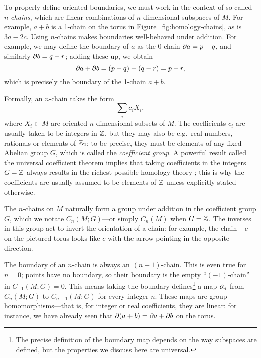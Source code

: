 To properly define oriented boundaries, we must work in the context of so-called $n$-\emph{chains}, which are linear combinations of $n$-dimensional subspaces of $M$. For example, $a+b$ is a 1-chain on the torus in Figure~\ref{fig:homology-chains}, as is $3a-2c$. Using $n$-chains makes boundaries well-behaved under addition. For example, we may define the boundary of $a$ as the 0-chain $\partial a = p - q$, and similarly $\partial b = q - r$; adding these up, we obtain
\begin{equation*}
	\partial a + \partial b = (p - q) + (q - r) = p - r,
\end{equation*}
which is precisely the boundary of the 1-chain $a+b$.

Formally, an $n$-chain takes the form
\begin{equation*}
	\sum_i c_i X_i,
\end{equation*}
where $X_i\subset M$ are oriented $n$-dimensional subsets of $M$. The coefficients $c_i$ are usually taken to be integers in $\mathbb{Z}$, but they may also be e.g.\ real numbers, rationals or elements of $\mathbb{Z}_2$; to be precise, they must be elements of any fixed Abelian group $G$, which is called the \emph{coefficient group}. A powerful result called the universal coefficient theorem implies that taking coefficients in the integers $G=\mathbb{Z}$ always results in the richest possible homology theory \parencite[\S3.A]{Hatcher_algebraic-topology}; this is why the coefficients are usually assumed to be elements of $\mathbb{Z}$ unless explicitly stated otherwise.

The $n$-chains on $M$ naturally form a group under addition in the coefficient group $G$, which we notate $C_n(M;G)$---or simply $C_n(M)$ when $G=\mathbb{Z}$. The inverses in this group act to invert the orientation of a chain: for example, the chain $-c$ on the pictured torus looks like $c$ with the arrow pointing in the opposite direction.

The boundary of an $n$-chain is always an $(n-1)$-chain. This is even true for $n=0$; points have no boundary, so their boundary is the empty ``$(-1)$-chain'' in $C_{-1}(M;G) = 0$. This means taking the boundary defines\footnote{
	The precise definition of the boundary map depends on the way subspaces are defined, but the properties we discuss here are universal.}
a map $\partial_n$ from $C_n(M;G)$ to $C_{n-1}(M;G)$ for every integer $n$. These maps are group homomorphisms---that is, for integer or real coefficients, they are linear: for instance, we have already seen that $\partial(a+b) = \partial a + \partial b$ on the torus.

